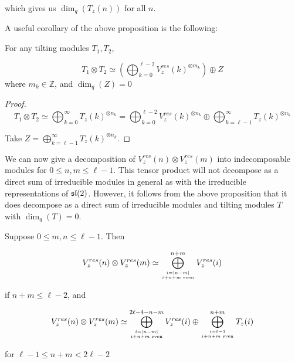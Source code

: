 which gives us $\dim_q(T_z(n))$ for all $n$.

A useful corollary of the above proposition is the following:

\begin{corollary}
\label{theorem:tensortilting}
    For any tilting modules $T_1, T_2$, 

    \begin{equation}
            T_1 \otimes T_2 \simeq \left(\bigoplus_{k=0}^{\ell - 2} V_z^{res}(k)^{\otimes m_k}\right) \oplus Z
    \end{equation}
    where $m_k \in \mathbb{Z}$, and $\dim_q(Z) = 0$
\end{corollary}
\begin{proof}
\begin{equation}
    T_1 \otimes T_2 \simeq \bigoplus_{k=0}^{\infty} T_z(k)^{\otimes n_k} =
    \bigoplus_{k=0}^{\ell-2} V_z^{res}(k)^{\otimes n_k} \oplus
    \bigoplus_{k=\ell-1}^{\infty} T_z(k)^{\otimes n_k}
\end{equation}

Take $Z = \displaystyle\bigoplus_{k=\ell-1}^{\infty} T_z(k)^{\otimes n_k}$.
\end{proof}

We can now give a decomposition of $V_z^{res}(n) \otimes V_z^{res}(m)$ into
indecomposable modules for $0 \leq n,m \leq \ell-1$.  This tensor product will
not decompose as a direct sum of irreducible modules in general as with the
irreducible representations of $\mathfrak{sl}(2)$. However, it follows from the above
proposition that it does decompose as a direct sum of irreducible modules and
tilting modules $T$ with $\dim_q(T) = 0$.

\begin{prop}
\label{theorem:decomposition}
Suppose $0 \leq m,n \leq \ell - 1$. Then

\begin{equation}
V_z^{res}(n) \otimes V_{z}^{res}(m) \simeq \bigoplus_{i=|n-m| \atop i + n + m \text{ even}}^{n+m} V_z^{res}(i) 
\end{equation}

if $n+m \leq \ell - 2$, and 

\begin{equation}
V_z^{res}(n) \otimes V_{z}^{res}(m) \simeq \bigoplus_{i=|n-m| \atop i + n + m \text{ even}}^{2\ell - 4 - n - m} V_z^{res}(i) 
                                    \oplus \bigoplus_{i = \ell - 1 \atop i + n + m \text{ even}} ^{n + m} T_z(i)
\end{equation}

for $\ell - 1 \leq n + m < 2\ell - 2$
\end{prop}


